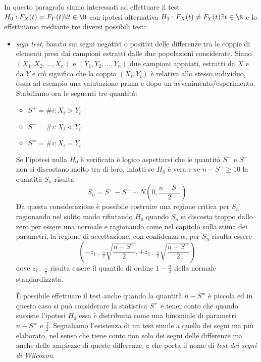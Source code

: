 In questo paragrafo siamo interessati ad effettuare il test $H_0:F_X(t) = F_Y(t) \forall t \in \R$ con ipotesi
alternativa $H_1:F_X(t) \neq F_Y(t) \exists t \in \R$ e lo effettuiamo mediante tre diversi possibili test:
\begin{itemize}
    \item \emph{sign test}, basato sui segni negativi o positivi delle differenze tra le coppie di elementi
          presi dai campioni estratti dalle due popolazioni considerate.\newline
          Siano $(X_1, X_2, \dots, X_n)$ e $(Y_1, Y_2, \dots, Y_n)$ due campioni appaiati, estratti da $X$ e da $Y$ e
          ciò significa che la coppia $(X_i, Y_i)$ è relativa allo stesso individuo, ossia ad esempio una valutazione
          prima e dopo un avvenimento/esperimento.\newline
          Stabiliamo ora le seguenti tre quantità:
          \begin{itemize}
              \item $S^+ = \#i : X_i > Y_i$
              \item $S^- = \#i : X_i < Y_i$
              \item $S^= = \#i : X_i = Y_i$
          \end{itemize}
          Se l'ipotesi nulla $H_0$ è verificata è logico aspettarsi che le quantità $S^+$ e $S^-$ non si discostano
          molto tra di loro, infatti se $H_0$ è vera e se $n - S^= \geq 10$ la quantità $S_n$ risulta
          \[ S_n = S^+ - S^- \sim N(0, \frac{n - S^=}{2}) \]
          Da questa considerazione è possibile costruire una regione critica per $S_n$ ragionando nel solito modo 
          rifiutando $H_0$ quando $S_n$ si discosta troppo dallo zero per essere una normale e ragionando come nel
          capitolo sulla stima dei parametri, la regione di accettazione, con confidenza $\alpha$, per $S_n$ risulta essere
          \[ (-z_{1 - \frac{\alpha}{2}} \sqrt{\frac{n - S^=}{2}}, +z_{1 - \frac{\alpha}{2}} \sqrt{\frac{n - S^=}{2}}) \]
          dove $z_{1 - \frac{\alpha}{2}}$ risulta essere il quantile di ordine $1 - \frac{\alpha}{2}$ della normale standardizzata.
          
          È possibile effettuare il test anche quando la quantità $n - S^=$ è piccola ed in questo caso si può considerare
          la statistica $S^+$ e tener conto che quando sussiste l'ipotesi $H_0$ essa è distribuita come una binomiale di
          parametri $n - S^=$ e $\frac{1}{2}$.\newline
          Segnaliamo l'esistenza di un test simile a quello dei segni ma più elaborato, nel senso che tiene conto 
          non solo dei segni delle differenze ma anche delle ampiezze di queste differenze, e che porta il nome di \emph{test dei segni di Wilcoxon}.
    

\end{itemize}
